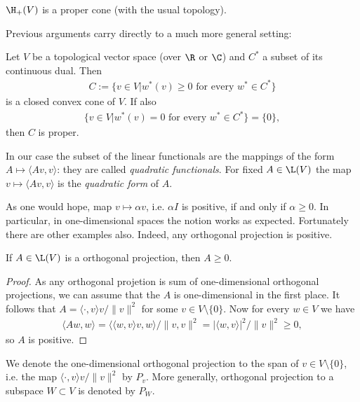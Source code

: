 \begin{lause}\label{basic_positive}
	$\H_{+}(V)$ is a proper cone (with the usual topology).
\end{lause}

Previous arguments carry directly to a much more general setting:

\begin{lause}\label{positive_machine}
	Let $V$ be a topological vector space (over $\R$ or $\C$) and $C^{*}$ a subset of its continuous dual. Then
	\begin{align*}
		C := \{v \in V | w^{*}(v) \geq 0 \text{ for every $w^{*} \in C^{*}$}\}
	\end{align*}
	is a closed convex cone of $V$. If also
	\begin{align*}
		\{v \in V | w^{*}(v) = 0 \text{ for every $w^{*} \in C^{*}$} \} = \{0\},
	\end{align*}
	then $C$ is proper.
\end{lause}

In our case the subset of the linear functionals are the mappings of the form $A \mapsto \langle A v, v \rangle$: they are called \textit{quadratic functionals}. For fixed $A \in \L(V)$ the map $v \mapsto \langle A v, v \rangle$ is the \textit{quadratic form} of $A$.

As one would hope, map $v \mapsto \alpha v$, i.e. $\alpha I$ is positive, if and only if $\alpha \geq 0$. In particular, in one-dimensional spaces the notion works as expected. Fortunately there are other examples also. Indeed, any orthogonal projection is positive.

\begin{prop}
	If $A \in \L(V)$ is a orthogonal projection, then $A \geq 0$.
\end{prop}
\begin{proof}
	As any orthogonal projetion is sum of one-dimensional orthogonal projections, we can assume that the $A$ is one-dimensional in the first place. It follows that $A = \langle \cdot, v \rangle v/\|v\|^2$ for some $v \in V \setminus \{0\}$. Now for every $w \in V$ we have
	\begin{align*}
		\langle A w, w \rangle = \langle \langle w, v \rangle v, w \rangle/\|v, v\|^{2} = |\langle w, v \rangle|^{2}/\|v\|^{2} \geq 0,
	\end{align*}
	so $A$ is positive.
\end{proof}

We denote the one-dimensional orthogonal projection to the span of $v \in V \setminus \{0\}$, i.e. the map $ \langle \cdot, v \rangle v/\|v\|^2$ by $P_{v}$. More generally, orthogonal projection to a subspace $W \subset V$ is denoted by $P_{W}$.

